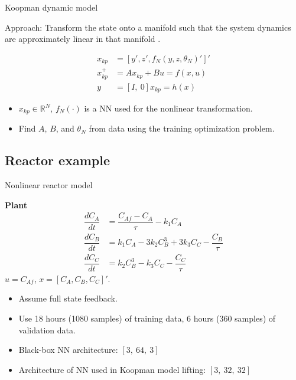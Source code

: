 \documentclass[xcolor=dvipsnames, 8pt]{beamer} %
\newcommand{\bbR}{\mathbb{R}}
\begin{document}
\begin{frame}{Koopman dynamic model}

Approach: Transform the state onto a manifold such that the system dynamics are 
approximately linear in that manifold \citep{korda:mezic:2018}.

\begin{align*} 
x_{kp} &= [y', z', f_N(y, z, \theta_N)']' \\
x_{kp}^+ &= Ax_{kp} + Bu = f(x, u)\\
y &= [I, \ 0] x_{kp} = h(x)
\end{align*}
	
\begin{itemize}
	\item $x_{kp} \in \bbR^N$, $f_N(\cdot)$ is a NN used for the nonlinear 
	transformation.
	\item Find $A$, $B$, and $\theta_N$ from data using the training 
	optimization problem.
\end{itemize}
\end{frame}

\subsection{Reactor example}


\begin{frame}{Nonlinear reactor model}
	
	\textbf{Plant}
	\begin{align*}
	\dfrac{dC_A}{dt} &= \dfrac{C_{Af} - C_A}{\tau} - k_1C_A\\
	\dfrac{dC_B}{dt} &= k_1C_A - 3k_2C^3_B + 3k_3C_C- \dfrac{C_B}{\tau}\\
	\dfrac{dC_C}{dt} &= k_2C^3_B - k_3C_C - \dfrac{C_C}{\tau}
	\end{align*}
	$u = C_{Af}$, $x = [C_A, C_B, C_C]'$.
	
\begin{itemize}
\item Assume full state feedback.
\item Use 18 hours (1080 samples) of training data, 6 hours (360 samples) of 
validation data.
\item Black-box NN architecture: $[3, \ 64, \ 3]$
\item Architecture of NN used in Koopman model lifting: $[3, \ 32, \ 32]$
\end{itemize}
\end{frame}
\end{document}
